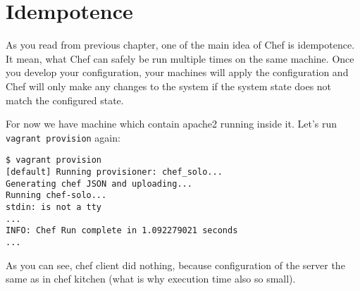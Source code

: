 \section{Idempotence}
\label{sec:solo-idempotence}

As you read from previous chapter, one of the main idea of Chef is idempotence. It mean, what Chef can safely be run multiple times on the same machine. Once you develop your configuration, your machines will apply the configuration and Chef will only make any changes to the system if the system state does not match the configured state.

For now we have machine which contain apache2 running inside it. Let's run \lstinline!vagrant provision! again:

\begin{lstlisting}[label=lst:my-cloud-idempotence1]
$ vagrant provision
[default] Running provisioner: chef_solo...
Generating chef JSON and uploading...
Running chef-solo...
stdin: is not a tty
...
INFO: Chef Run complete in 1.092279021 seconds
...
\end{lstlisting}

As you can see, chef client did nothing, because configuration of the server the same as in chef kitchen (what is why execution time also so small).
